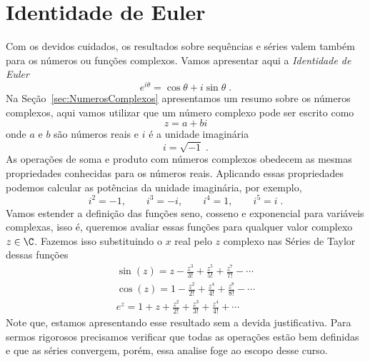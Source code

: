 \section{Identidade de Euler}

Com os devidos cuidados, os resultados sobre sequências e séries
valem também para os números ou funções complexos. Vamos apresentar aqui a
\emph{Identidade de Euler}
\[
e^{i\theta} = \cos\theta + i\sin\theta   \;.
\]
Na Seção~\ref{sec:NumerosComplexos} apresentamos um resumo sobre os
números complexos, aqui vamos utilizar que um número complexo
pode ser escrito como
\[
z = a + bi
\]
onde $a$ e $b$ são números reais e $i$ é a unidade imaginária
\[
i = \sqrt{-1}   \;.
\]
As operações de soma e produto com números complexos obedecem as mesmas
propriedades conhecidas para os números reais. Aplicando essas propriedades
podemos calcular as potências da unidade imaginária, por exemplo,
\[
i^2 = -1, \qquad i^3 = -i, \qquad i^4 = 1, \qquad i^5 = i   \;.
\]
Vamos estender a definição das funções seno, cosseno e exponencial
para variáveis complexas, isso é, queremos avaliar essas funções para qualquer
valor complexo $z\in\C$. Fazemos isso substituindo o $x$ real pelo $z$ complexo
nas Séries de Taylor dessas funções
\begin{gather*}
  \sin(z) = z - \frac{z^3}{3!} + \frac{z^5}{5!} + \frac{z^7}{7!} - \cdots \\[3mm]
  \cos(z) = 1 - \frac{z^2}{2!} + \frac{z^4}{4!} + \frac{z^8}{8!} - \cdots \\[3mm]
  e^z = 1 + z + \frac{z^2}{2!} + \frac{z^3}{3!} + \frac{z^4}{4!} +  \cdots
\end{gather*}
Note que, estamos apresentando esse resultado sem a devida justificativa.
Para sermos rigorosos precisamos verificar que todas as operações estão bem
definidas e que as séries convergem, porém, essa analise foge ao escopo desse curso.

